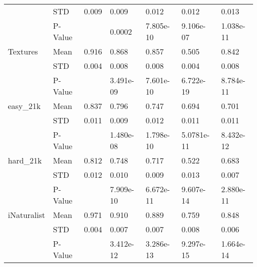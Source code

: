 \begin{table*}[p]
{\begin{tabular}{lll|l|l|l|l}
             & \multicolumn{1}{l|}{STD}           & 0.009 & 0.009                  & 0.012                  & 0.012           & 0.013            \\
             & \multicolumn{1}{l|}{P-Value}       &       & 0.0002                 & 7.805e-10              & 9.106e-07       & 1.038e-11        \\ \hline
Textures     & \multicolumn{1}{l|}{Mean}          & 0.916 & 0.868                  & 0.857                  & 0.505           & 0.842            \\
             & \multicolumn{1}{l|}{STD}           & 0.004 & 0.008                  & 0.008                  & 0.004           & 0.008            \\
             & \multicolumn{1}{l|}{P-Value}       &       & 3.491e-09              & 7.601e-10              & 6.722e-19       & 8.784e-11        \\ \hline
easy\_21k    & \multicolumn{1}{l|}{Mean}          & 0.837 & 0.796                  & 0.747                  & 0.694           & 0.701            \\
             & \multicolumn{1}{l|}{STD}           & 0.011 & 0.009                  & 0.012                  & 0.011           & 0.011            \\
             & \multicolumn{1}{l|}{P-Value}       &       & 1.480e-08              & 1.798e-10              & 5.0781e-11      & 8.432e-12        \\ \hline
hard\_21k    & \multicolumn{1}{l|}{Mean}          & 0.812 & 0.748                  & 0.717                  & 0.522           & 0.683            \\
             & \multicolumn{1}{l|}{STD}           & 0.012 & 0.010                  & 0.009                  & 0.013           & 0.007            \\
             & \multicolumn{1}{l|}{P-Value}       &       & 7.909e-10              & 6.672e-11              & 9.607e-14       & 2.880e-11        \\ \hline
iNaturalist  & \multicolumn{1}{l|}{Mean}          & 0.971 & 0.910                  & 0.889                  & 0.759           & 0.848            \\
             & \multicolumn{1}{l|}{STD}           & 0.004 & 0.007                  & 0.007                  & 0.008           & 0.006            \\
             & \multicolumn{1}{l|}{P-Value}       &       & 3.412e-12              & 3.286e-13              & 9.297e-15       & 1.664e-14 
\end{tabular}
}


\end{table*}

